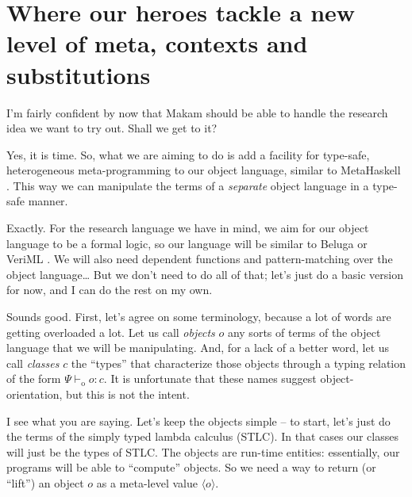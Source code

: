 \section{Where our heroes tackle a new level of meta, contexts and
substitutions}\label{where-our-heroes-tackle-a-new-level-of-meta-contexts-and-substitutions}

\heroSTUDENT{} I'm fairly confident by now that Makam should be able to handle
the research idea we want to try out. Shall we get to it?

\heroADVISOR{} Yes, it is time. So, what we are aiming to do is add a facility
for type-safe, heterogeneous meta-programming to our object language,
similar to MetaHaskell \citep{mainland2012explicitly}. This way we can
manipulate the terms of a \emph{separate} object language in a type-safe
manner.

\heroSTUDENT{} Exactly. For the research language we have in mind, we aim for
our object language to be a formal logic, so our language will be
similar to Beluga \citep{beluga-main-reference} or VeriML
\citep{veriml-main-reference}. We will also need dependent functions and
pattern-matching over the object language\ldots{} But we don't need to
do all of that; let's just do a basic version for now, and I can do the
rest on my own.

\newcommand\dep[1]{\ensuremath{#1}}
\newcommand\lift[1]{\ensuremath{\langle#1\rangle}}
\newcommand\odash[0]{\ensuremath{\vdash_{\text{o}}}}
\newcommand\wf[0]{\ensuremath{\; \text{wf}}}
\newcommand\aq[1]{\ensuremath{\texttt{aq}(#1)}}
\newcommand\aqopen[1]{\ensuremath{\texttt{aqopen}(#1)}}

\heroADVISOR{} Sounds good. First, let's agree on some terminology, because a
lot of words are getting overloaded a lot. Let us call \emph{objects}
\(o\) any sorts of terms of the object language that we will be
manipulating. And, for a lack of a better word, let us call
\emph{classes} \(c\) the ``types'' that characterize those objects
through a typing relation of the form \(\Psi \odash o : c\). It is
unfortunate that these names suggest object-orientation, but this is not
the intent.

\heroSTUDENT{} I see what you are saying. Let's keep the objects simple -- to
start, let's just do the terms of the simply typed lambda calculus
(STLC). In that cases our classes will just be the types of STLC. The
objects are run-time entities: essentially, our programs will be able to
``compute'' objects. So we need a way to return (or ``lift'') an object
\(o\) as a meta-level value \(\lift{o}\).

